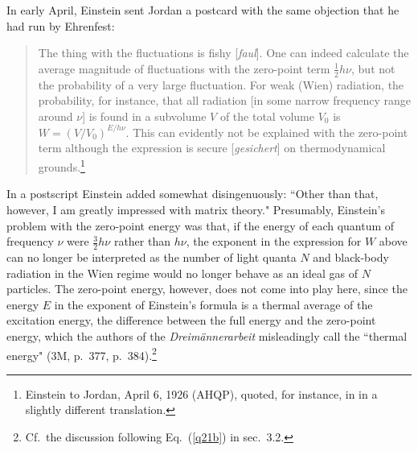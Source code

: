 \documentclass{elsart}
\begin{document}
In early April, Einstein sent Jordan a postcard with the same objection that he had run by Ehrenfest:
\begin{quotation}
The thing with the fluctuations is fishy [{\it faul}]. One can indeed calculate the average magnitude of fluctuations  with the zero-point term $\frac{1}{2} h \nu$, but not the probability of a very large fluctuation. For weak (Wien) radiation, the probability, for instance, that all radiation [in some narrow frequency range around $\nu$] is found in a subvolume $V$ of the total volume $V_0$ is
$
W = \left( V/V_0 \right)^{E/h \nu}.
$
This can evidently not be explained with the zero-point term although the expression is secure [{\it gesichert}] on thermodynamical grounds.\footnote{Einstein to Jordan, April 6, 1926 (AHQP), quoted, for instance, in \citep[Vol.\ 3, p.\ 156]{Mehra Rechenberg} in a slightly different translation.}
\end{quotation}
In a postscript Einstein added somewhat disingenuously: ``Other than that, however, I am greatly impressed with matrix theory." Presumably, Einstein's problem with the zero-point energy was that, if the energy of each quantum of frequency $\nu$ were $\frac{3}{2}h\nu$ rather than $h\nu$, the exponent in the expression for $W$ above can no longer be interpreted as the number of light quanta $N$ and black-body radiation in the Wien regime would no longer behave as an ideal gas of $N$ particles. The zero-point energy, however, does not come into play here, since the energy $E$ in the exponent of Einstein's formula is a thermal average of the excitation energy, the difference between the full energy and the zero-point energy, which the authors of the  {\it Dreim\"annerarbeit} misleadingly call the ``thermal energy" (3M, p.\ 377, p.\ 384).\footnote{Cf.\ the discussion following Eq.\ (\ref{q21b}) in sec.\ 3.2.} 
\end{document}
